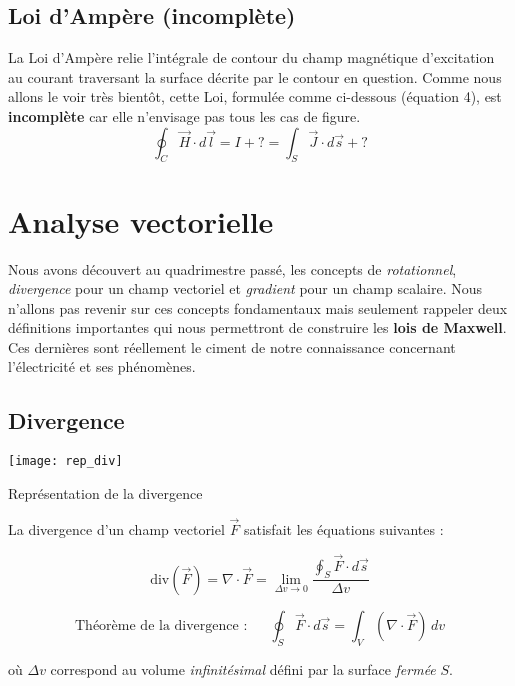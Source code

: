 \subsection{Loi d'Ampère (incomplète)}

La Loi d'Ampère relie l'intégrale de contour du champ magnétique d'excitation au courant traversant la surface décrite par le contour en question. 
Comme nous allons le voir très bientôt, cette Loi, formulée comme ci-dessous (équation 4), est \textbf{incomplète} car elle n'envisage pas tous les cas de figure.
\begin{equation}
 \oint_{C} \vec{H} \cdot d\vec{l} = I + ? = \int_{S} \vec{J} \cdot d\vec{s} + ? 
 \label{AmpèreIntegral}
\end{equation}

\section{Analyse vectorielle}

Nous avons découvert au quadrimestre passé, les concepts de \textit{rotationnel}, \textit{divergence} pour un champ vectoriel et \textit{gradient} pour un champ scalaire.
Nous n'allons pas revenir sur ces concepts fondamentaux mais seulement rappeler deux définitions importantes qui nous permettront de construire les \textbf{lois de Maxwell}. 
Ces dernières sont réellement le ciment de notre connaissance concernant l'électricité et ses phénomènes.

\subsection{Divergence} 
\begin{marginfigure}[-5cm]
	\texttt{[image: rep\_div]}
	\caption{Représentation de la divergence}
\end{marginfigure}

La divergence d'un champ vectoriel $\vec{F}$ satisfait les équations suivantes : 

\[ \text{div}(\vec{F}) = \nabla \cdot \vec{F} = \lim_{\Delta v \to 0} \frac{\oint_{S} \vec{F} \cdot d\vec{s}}{\Delta v} \]

\[\mbox{Théorème de la divergence : } \hspace{15pt} \oint_{S} \vec{F} \cdot d\vec{s} = \int_{V} (\nabla \cdot \vec{F}) \, dv\]

où $\Delta v$ correspond au volume \textit{infinitésimal} défini par la surface \textit{fermée} $S$.



